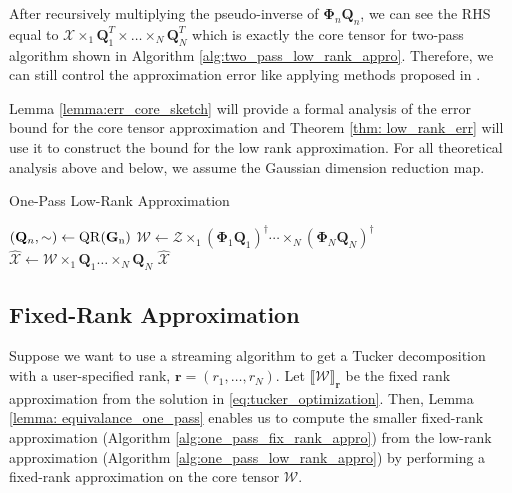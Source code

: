 After recursively multiplying the pseudo-inverse of $\mathbf{\Phi}_n\mathbf{Q}_n$, we can see the RHS equal to $\mathscr{X} \times_1 \mathbf{Q}_1^T  \times \dots \times_N \mathbf{Q}^T_N$ which is exactly the core tensor for two-pass algorithm shown in Algorithm \ref{alg:two_pass_low_rank_appro}. Therefore, we can still control the approximation error like applying methods proposed in \citep{clarkson2009numerical,tropp2017practical}. 

Lemma \ref{lemma:err_core_sketch} will provide a formal analysis of the error bound for the core tensor approximation and Theorem \ref{thm: low_rank_err} will use it to construct the bound for the low rank approximation. For all theoretical analysis above and below, we assume the Gaussian dimension reduction map. 

\begin{algorithm}[ht]
\caption{One-Pass Low-Rank Approximation}\label{alg:one_pass_low_rank_appro}
  \begin{algorithmic}[1]
  \State $(\mathbf{Q}_n, \sim) \leftarrow \rm{QR}(\mathbf{G}_n)$ 
  \EndFor 
  \State $\mathscr{W} \leftarrow \mathscr{Z}\times_1 (\mathbf{\Phi}_1\mathbf{Q}_1)^\dag \cdots \times_N (\mathbf{\Phi}_N\mathbf{Q}_N)^\dag $
  \State $\hat{\mathscr{X}} \leftarrow \mathscr{W} \times_1 \mathbf{Q}_1 \dots \times_N \mathbf{Q}_N$
  \State \Return $\hat{\mathscr{X}}$ 
  \EndFunction
\end{algorithmic}
\end{algorithm}

\subsection{Fixed-Rank Approximation}
Suppose we want to use a streaming algorithm to get a Tucker decomposition with a user-specified rank, $\mathbf{r} = (r_1, \dots, r_N)$. Let $\llbracket \mathscr{W} \rrbracket _{\mathbf{r}}$ be the fixed rank approximation from the solution in \eqref{eq:tucker_optimization}. Then, Lemma \ref{lemma: equivalance_one_pass} enables us to compute the smaller fixed-rank approximation (Algorithm \ref{alg:one_pass_fix_rank_appro}) from the low-rank approximation (Algorithm \ref{alg:one_pass_low_rank_appro}) by performing a fixed-rank approximation on the core tensor $\mathscr{W}$. 

